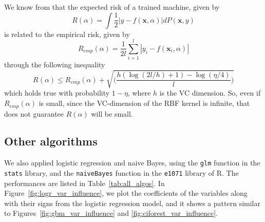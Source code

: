 We know from \cite{Vapnik95} that the expected risk of a trained machine, given by
\begin{equation}
\label{eqn:risk}
R(\alpha) = \int\frac{1}{2}|y - f(\mathbf{x}, \alpha)|dP(\mathbf{x}, y)
\end{equation}
is related to the empirical risk, given by
\begin{equation}
\label{eqn:emp-risk}
R_{emp}(\alpha) = \frac{1}{2l}\sum_{i=1}^l|y_i - f({\mathbf{x}}_i, \alpha)|
\end{equation}
through the following inequality
\begin{equation}
\label{eqn:risk-relation}
R(\alpha) \le R_{emp}(\alpha) + \sqrt{\Bigg(\frac{h(\log(2l/h) + 1) - \log({\eta}/4)}{l}\Bigg)} 
\end{equation}
which holds true with probability $1 - \eta$, where $h$ is the VC dimension. So, even if $R_{emp}(\alpha)$ is small, since the VC-dimension \cite{Vapnik95} of the RBF kernel is infinite, that does not guarantee $R(\alpha)$ will be small.

\subsection{Other algorithms}
\label{subsec:other_algos}
We also applied logistic regression and naive Bayes, using the \texttt{glm} function in the \texttt{stats} \cite{stats} library, and the \texttt{naiveBayes} function in the \texttt{e1071} \cite{e1071} library of R. The performances are listed in Table~\ref{tab:all_algos}. In Figure~\ref{fig:logr_var_influence}, we plot the coefficients of the variables along with their signs from the logistic regression model, and it shows a pattern similar to Figures~\ref{fig:gbm_var_influence} and \ref{fig:ciforest_var_influence}.

